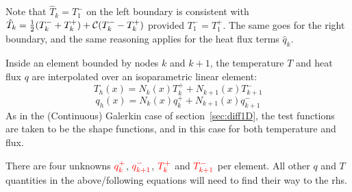 \begin{remark}
Note that $\hat{T}_k=T_1^-$ on the left boundary is consistent with 
$\hat{T}_k=\frac{1}{2}(T_k^-+T_k^+) + {\cal C} (T_k^- - T_k^+)$ provided $T_1^-=T_1^+$.
The same goes for the right boundary, and the same reasoning applies for the heat flux terms $\hat{q}_k$. 
\end{remark}

Inside an element bounded by nodes $k$ and $k+1$, 
the temperature $T$ and heat flux $q$ are interpolated over an isoparametric linear element:
\[
T_h(x) = N_k(x) T_k^+ + N_{k+1}(x)T_{k+1}^-
\]
\[
q_h(x) = N_k(x) q_k^+ + N_{k+1}(x)q_{k+1}^-
\]
As in the (Continuous) Galerkin case of section~\ref{sec:diff1D}, the test functions are taken to 
be the shape functions, and in this case for both temperature and flux. 

There are four unknowns ${\color{red} q_k^+}$, ${\color{red} q_{k+1}^-}$, 
${\color{red}T_k^+}$ and ${\color{red}T_{k+1}^-}$ per element. 
All other $q$ and $T$ quantities in the above/following equations will need to find their way to the rhs. 

